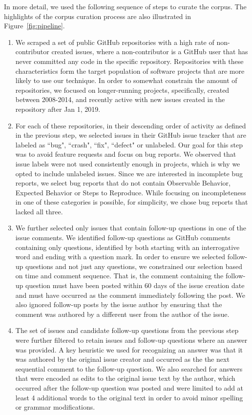 In more detail, we used the following sequence of steps to curate the corpus. The highlights of the corpus curation process are also illustrated in Figure~\ref{fig:pipeline}.
\begin{enumerate}
\item We scraped a set of public GitHub repositories with a high rate of
non-contributor created issues, where a non-contributor is a GitHub user that has never
committed any code in the specific repository. Repositories with these characteristics form
the target population of software projects that are more likely to use our technique. In order
to somewhat constrain  the amount of repositories, we focused on longer-running projects,
specifically, created between 2008-2014, and recently active with new issues created in the repository after Jan 1, 2019.
\item For each of these repositories, in their descending order of activity as defined in the previous step,
we selected issues in their GitHub issue tracker that are labeled as ``bug", ``crash", ``fix", ``defect" or unlabeled. Our goal for this step was
to avoid feature requests and focus on bug reports. We observed that issue labels were not used consistently enough
in projects, which is why we opted to include unlabeled issues. Since we are interested in incomplete bug reports, we select bug reports that do not contain Observable Behavior, Expected Behavior or Steps to Reproduce. While focusing on incompleteness in one of these categories is possible, for simplicity, we chose bug reports that lacked all three.
\item We further selected only issues that contain follow-up questions in one of the issue comments.  We identified follow-up questions as GitHub comments containing only questions, identified by both starting with an interrogative word and ending with a question mark. In order to ensure we selected follow-up questions and not just
any questions, we constrained our selection based on time and comment sequence. That is, the comment containing the follow-up question must have been posted within 60 days of the issue creation date and must have occurred as the comment immediately following the post. We also ignored follow-up posts by the issue author by ensuring that the comment was authored by a different user from the author of the issue.
\item The set of issues and candidate follow-up questions from the previous step were further filtered to
retain issues and follow-up questions where an answer was provided. A key heuristic we used for recognizing an answer was that it was authored
by the original issue creator and occurred as the the next sequential comment
to the follow-up question. We also searched for answers that were encoded as edits to the original issue text by the author, which occurred after the follow-up question was posted and were limited to add at least 4 additional words to the original text in order to avoid minor spelling or grammar modifications.
\end{enumerate}

